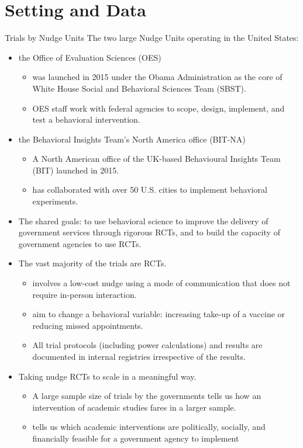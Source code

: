 \documentclass[dvipdfmx,11pt]{beamer}
\begin{document}
\section{Setting and Data}
\frame{\sectionpage}

\begin{frame}{Trials by Nudge Units}
  The two large Nudge Units operating in the United States:
  \begin{itemize}
    \item the Office of Evaluation Sciences (OES)
    \begin{itemize}
      \item was launched in 2015 under the Obama Administration as the core of White House Social and Behavioral Sciences Team (SBST).
      \item OES staff work with federal agencies to scope, design, implement, and test a behavioral intervention.
    \end{itemize}
    \item the Behavioral Insights Team's North America office (BIT-NA)
    \begin{itemize}
      \item A North American office of the UK-based Behavioural Insights Team (BIT) launched in 2015.
      \item has collaborated with over 50 U.S. cities to implement behavioral experiments.
    \end{itemize}
    \item The shared goals: to use behavioral science to improve the delivery of government services through rigorous RCTs, and to build the capacity of government agencies to use RCTs.
  \end{itemize}
\end{frame}

\begin{frame}{}
  \begin{itemize}
    \item The vast majority of the trials are RCTs.
    \begin{itemize}
      \item involves a low-cost nudge using a mode of communication that does not require in-person interaction.
      \item aim to change a behavioral variable: increasing take-up of a vaccine or reducing missed appointments.
      \item All trial protocols (including power calculations) and results are documented in internal registries irrespective of the results.
    \end{itemize}
    \item Taking nudge RCTs to scale in a meaningful way.
    \begin{itemize}
      \item A large sample size of trials by the governments tells us how an intervention of academic studies fares in a larger sample.
      \item tells us which academic interventions are politically, socially, and financially feasible for a government agency to implement 
    \end{itemize}
  \end{itemize}
\end{frame}
\end{document}
